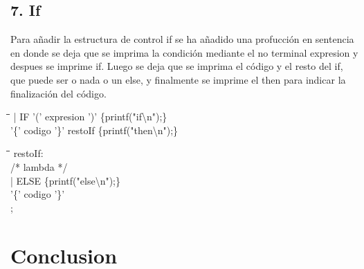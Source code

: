 \documentclass[11pt,spanish]{article}
\begin{document}
        \subsection*{7. If}
        Para añadir la estructura de control if se ha añadido una profucción en sentencia en donde se deja que se imprima la condición mediante el no terminal expresion y despues se imprime if. Luego se deja que se imprima el código y el resto del if, que puede ser o nada o un else, y finalmente se imprime el then para indicar la finalización del código.
        \begin{tabbing}
            \hspace*{1cm}\=\hspace*{1cm}\= \hspace*{8cm}\=\kill
            \>| IF '(' expresion ')'\>\> \{printf("if\textbackslash n");\}\\
            \>\>'\{' codigo '\}' restoIf\> \{printf("then\textbackslash n");\}\\
        \end{tabbing}
        \begin{tabbing}
            \hspace*{1cm}\=\hspace*{1cm}\= \hspace*{8cm}\=\kill
            restoIf:\\
            \>/* lambda */ \\
            \>| ELSE\>\> \{printf("else\textbackslash n");\}\\
            \>'\{' codigo '\}'\\
            ;
        \end{tabbing}
	\section{Conclusion}
	
\end{document}
